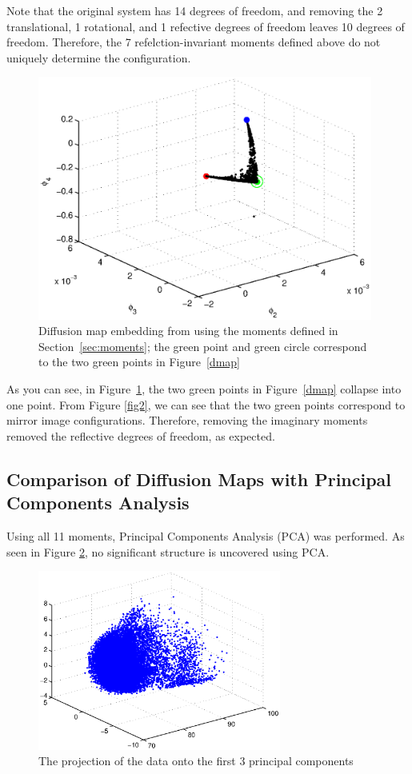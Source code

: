 Note that the original system has 14 degrees of freedom, and removing the 2 translational, 1 rotational, and 1 refective degrees of freedom leaves 10 degrees of freedom. Therefore, the 7 refelction-invariant moments defined above do not uniquely determine the configuration. 

\begin{figure}[t]
\centering
\includegraphics[width=11cm]{dmap_noreflec.eps}
\caption[Diffusion maps embedding of Lennard-Jones cluster using rotation-invariant moments]{Diffusion map embedding from using the moments defined in Section~\ref{sec:moments}; the green point and green circle correspond to the two green points in Figure~\ref{dmap}}
\label{dmap_noreflec}
\end{figure}

As you can see, in Figure~\ref{dmap_noreflec}, the two green points in Figure~\ref{dmap} collapse into one point. From Figure \ref{fig2}, we can see that the two green points correspond to mirror image configurations. Therefore, removing the imaginary moments removed the reflective degrees of freedom, as expected. 

\subsection{Comparison of Diffusion Maps with Principal Components Analysis}
Using all 11 moments, Principal Components Analysis (PCA) was performed. As seen in Figure \ref{PCA}, no significant structure is uncovered using PCA.
\begin{figure}[t]
\centering
\includegraphics[width=8cm]{PCA.eps}
\caption[Principal components embedding of Lennard-Jones cluster]{The projection of the data onto the first 3 principal components}
\label{PCA}
\end{figure}

